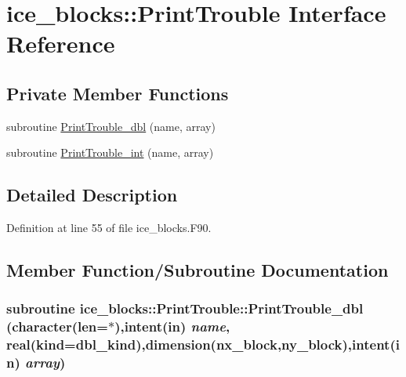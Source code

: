 \hypertarget{interfaceice__blocks_1_1PrintTrouble}{
\section{ice\_\-blocks::PrintTrouble Interface Reference}
\label{interfaceice__blocks_1_1PrintTrouble}
}
\subsection*{Private Member Functions}
\begin{DoxyCompactItemize}
\item 
subroutine \hyperlink{interfaceice__blocks_1_1PrintTrouble_a72717e91f1452cc2ef9520129c8813d2}{PrintTrouble\_\-dbl} (name, array)
\item 
subroutine \hyperlink{interfaceice__blocks_1_1PrintTrouble_af276702896f3c2a7db4981f82739bf1f}{PrintTrouble\_\-int} (name, array)
\end{DoxyCompactItemize}


\subsection{Detailed Description}


Definition at line 55 of file ice\_\-blocks.F90.

\subsection{Member Function/Subroutine Documentation}
\hypertarget{interfaceice__blocks_1_1PrintTrouble_a72717e91f1452cc2ef9520129c8813d2}{
\subsubsection[{PrintTrouble\_\-dbl}]{\setlength{\rightskip}{0pt plus 5cm}subroutine ice\_\-blocks::PrintTrouble::PrintTrouble\_\-dbl (character(len=$\ast$),intent(in) {\em name}, \/  real(kind=dbl\_\-kind),dimension({\bf nx\_\-block},{\bf ny\_\-block}),intent(in) {\em array})}}
\label{interfaceice__blocks_1_1PrintTrouble_a72717e91f1452cc2ef9520129c8813d2}


